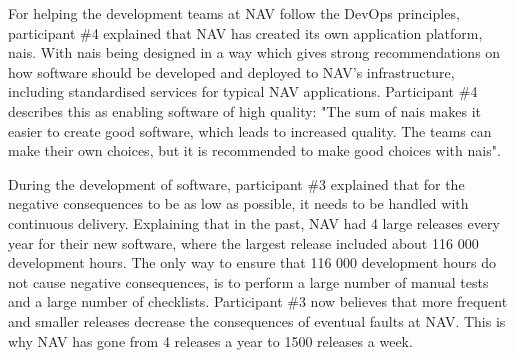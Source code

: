 
For helping the development teams at NAV follow the DevOps principles, participant \#4 explained that NAV has created its own application platform, \gls{nais}. With \gls{nais} being designed in a way which gives strong recommendations on how software should be developed and deployed to NAV's infrastructure, including standardised services for typical NAV applications. Participant \#4 describes this as enabling software of high quality: "The sum of \gls{nais} makes it easier to create good software, which leads to increased quality. The teams can make their own choices, but it is recommended to make good choices with \gls{nais}".


During the development of software, participant \#3 explained that for the negative consequences to be as low as possible, it needs to be handled with continuous delivery. Explaining that in the past, NAV had 4 large releases every year for their new software, where the largest release included about 116 000 development hours. The only way to ensure that 116 000 development hours do not cause negative consequences, is to perform a large number of manual tests and a large number of checklists. Participant \#3 now believes that more frequent and smaller releases decrease the consequences of eventual faults at NAV. This is why NAV has gone from 4 releases a year to 1500 releases a week.

